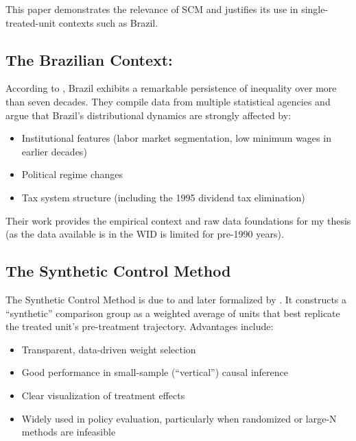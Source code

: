 \documentclass[11pt,a4paper]{article}
\begin{document}
\par
This paper demonstrates the relevance of SCM and justifies its use in single-treated-unit contexts such as Brazil.

\subsection{The Brazilian Context:}

\par
According to \cite{morgan2025distribution}, Brazil exhibits a remarkable persistence of inequality over more than seven decades. 
They compile data from multiple statistical agencies and argue that Brazil’s distributional dynamics are strongly affected by:

\begin{itemize}[leftmargin= 2cm]
    \item Institutional features (labor market segmentation, low minimum wages in earlier decades)
    \item Political regime changes
    \item Tax system structure (including the 1995 dividend tax elimination)
\end{itemize}

\par
Their work provides the empirical context and raw data foundations for my thesis (as the data available is in the WID is limited for pre-1990 years).

\pagebreak 

\subsection{The Synthetic Control Method}
\par
The Synthetic Control Method is due to \cite{abadie2003economic} and later formalized by \cite{abadie2010synthetic}. 
It constructs a “synthetic” comparison group as a weighted average of units that best replicate the treated unit’s pre-treatment trajectory.
Advantages include:

\begin{itemize}[leftmargin= 1.5cm]
    \item Transparent, data-driven weight selection
    \item Good performance in small-sample (“vertical”) causal inference
    \item Clear visualization of treatment effects
    \item Widely used in policy evaluation, particularly when randomized or large-N methods are infeasible
\end{itemize}
\end{document}
